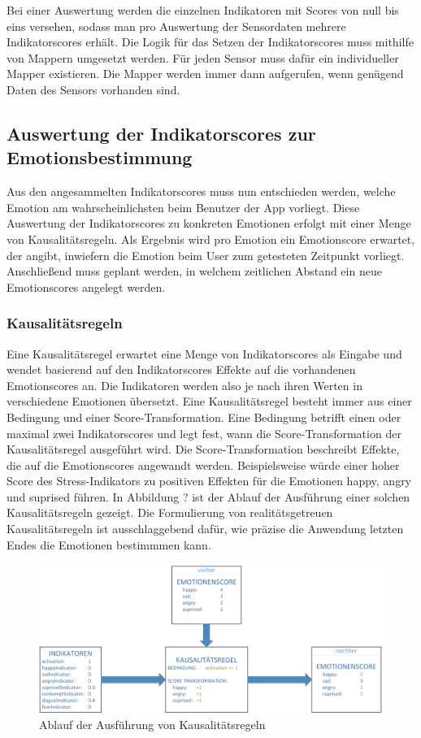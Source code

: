 Bei einer Auswertung werden die einzelnen Indikatoren mit Scores von null bis eins versehen, sodass man pro Auswertung der Sensordaten mehrere Indikatorscores erhält. Die Logik für das Setzen der Indikatorscores muss mithilfe von Mappern umgesetzt werden. Für jeden Sensor muss dafür ein individueller Mapper existieren. Die Mapper werden immer dann aufgerufen, wenn genügend Daten des Sensors vorhanden sind. \newline
\subsection{Auswertung der Indikatorscores zur Emotionsbestimmung}
Aus den angesammelten Indikatorscores muss nun entschieden werden, welche Emotion am wahrscheinlichsten beim Benutzer der App vorliegt. Diese Auswertung der Indikatorscores zu konkreten Emotionen erfolgt mit einer Menge von Kausalitätsregeln. Als Ergebnis wird pro Emotion ein Emotionscore erwartet, der angibt, inwiefern die Emotion beim User zum getesteten Zeitpunkt vorliegt. Anschließend muss geplant werden, in welchem zeitlichen Abstand ein neue Emotionscores angelegt werden.
\subsubsection{Kausalitätsregeln}
Eine Kausalitätsregel erwartet eine Menge von Indikatorscores als Eingabe und wendet basierend auf den Indikatorscores Effekte auf die vorhandenen Emotionscores an. Die Indikatoren werden also je nach ihren Werten in verschiedene Emotionen übersetzt. \newline Eine Kausalitätsregel besteht immer aus einer Bedingung und einer Score-Transformation. Eine Bedingung betrifft einen oder maximal zwei Indikatorscores und legt fest, wann die Score-Transformation der Kausalitätsregel ausgeführt wird. Die Score-Transformation beschreibt Effekte, die auf die Emotionscores angewandt werden. Beispielsweise würde einer hoher Score des Stress-Indikators zu positiven Effekten für die Emotionen happy, angry und suprised führen. In Abbildung ? ist der Ablauf der Ausführung einer solchen Kausalitätsregeln gezeigt. Die Formulierung von realitätsgetreuen Kausalitätsregeln ist ausschlaggebend dafür, wie präzise die Anwendung letzten Endes die Emotionen bestimmmen kann. \newline
\begin{figure}[h]
	\centering
	\includegraphics[width=16cm]{Bilder/causalityrules.png}
	\caption[Ablauf der Ausführung von Kausalitätsregeln]{Ablauf der Ausführung von Kausalitätsregeln}
\end{figure}%
